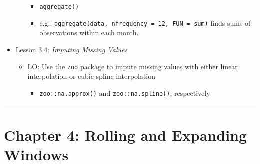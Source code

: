 \documentclass[
]{book}
\providecommand{\tightlist}{%
  \setlength{\itemsep}{0pt}\setlength{\parskip}{0pt}}
\begin{document}
\begin{itemize}
\begin{itemize}
    \begin{itemize}
    \tightlist
    \item
      \texttt{aggregate()}
    \item
      e.g.: \texttt{aggregate(data,\ nfrequency\ =\ 12,\ FUN\ =\ sum)} finds sums of observations within each month.
    \end{itemize}
  \end{itemize}
\item
  Lesson 3.4: \emph{Imputing Missing Values}

  \begin{itemize}
  \tightlist
  \item
    LO: Use the \texttt{zoo} package to impute missing values with either linear interpolation or cubic spline interpolation

    \begin{itemize}
    \tightlist
    \item
      \texttt{zoo::na.approx()} and \texttt{zoo::na.spline()}, respectively
    \end{itemize}
  \end{itemize}
\end{itemize}

\begin{center}\rule{0.5\linewidth}{0.5pt}\end{center}

\hypertarget{chapter-4-rolling-and-expanding-windows}{%
\section{Chapter 4: Rolling and Expanding Windows}\label{chapter-4-rolling-and-expanding-windows}}
\end{document}

